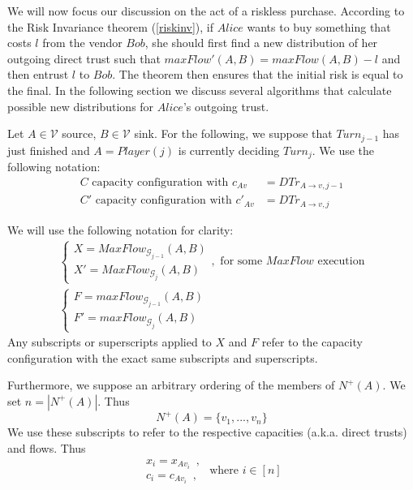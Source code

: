We will now focus our discussion on the act of a riskless purchase. According to the Risk Invariance theorem (\ref{riskinv}),
if $Alice$ wants to buy something that costs $l$ from the vendor $Bob$, she should first find a new distribution of her
outgoing direct trust such that $maxFlow'\left(A, B\right) = maxFlow\left(A, B\right) - l$ and then entrust $l$ to $Bob$.
The theorem then ensures that the initial risk is equal to the final. In the following section we discuss several algorithms
that calculate possible new distributions for $Alice$'s outgoing trust.

Let $A \in \mathcal{V}$ source, $B \in \mathcal{V}$ sink. For the following, we suppose that $Turn_{j-1}$ has just finished
and $A = Player\left(j\right)$ is currently deciding $Turn_j$. We use the following notation:
\begin{align*}
   C \mbox{ capacity configuration with } c_{Av} &= DTr_{A \rightarrow v, j-1} \\
   C' \mbox{ capacity configuration with } c'_{Av} &= DTr_{A \rightarrow v, j}
\end{align*}

We will use the following notation for clarity:
\begin{equation*}
\begin{gathered}
  \begin{cases}
    X = MaxFlow_{\mathcal{G}_{j-1}}\left(A, B\right) \\
    X' = MaxFlow_{\mathcal{G}_j}\left(A, B\right)
  \end{cases}, \mbox{ for some } MaxFlow \mbox{ execution} \\
  \begin{cases}
    F = maxFlow_{\mathcal{G}_{j-1}}\left(A, B\right) \\
    F' = maxFlow_{\mathcal{G}_j}\left(A, B\right)
  \end{cases}
\end{gathered}
\end{equation*}
Any subscripts or superscripts applied to $X$ and $F$ refer to the capacity configuration with the exact same subscripts and
superscripts.

Furthermore, we suppose an arbitrary ordering of the members of $N^{+}\left(A\right)$. We set $n = |N^{+}\left(A\right)|$.
Thus
\begin{equation*}
   N^{+}\left(A\right) = \{v_1, ..., v_n\}
\end{equation*}
We use these subscripts to refer to the respective capacities (a.k.a. direct trusts) and flows. Thus
\begin{equation*}
   \begin{array}{l}
      x_i = x_{Av_i} \enspace, \\
      c_i = c_{Av_i} \enspace,
   \end{array}
   \mbox{ where } i \in [n]
\end{equation*}
